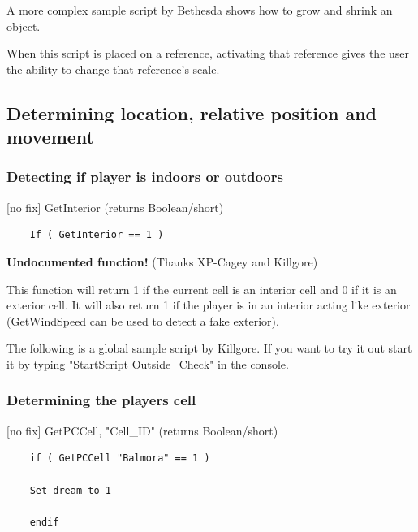 A more complex sample script by Bethesda shows how to grow and shrink an
object.

When this script is placed on a reference, activating that reference
gives the user the ability to change that reference's scale.



\hypertarget{determining-location-relative-position-and-movement}{%
\subsection{\texorpdfstring{\hfill\break
Determining location, relative position and
movement}{ Determining location, relative position and movement}}\label{determining-location-relative-position-and-movement}}

\hypertarget{detecting-if-player-is-indoors-or-outdoors}{%
\subsubsection{Detecting if player is indoors or
outdoors}\label{detecting-if-player-is-indoors-or-outdoors}}

{[}no fix{]} GetInterior (returns Boolean/short)

\begin{lstlisting}
	If ( GetInterior == 1 )
\end{lstlisting}

\textbf{Undocumented function!} (Thanks XP-Cagey and Killgore)

This function will return 1 if the current cell is an interior cell and
0 if it is an exterior cell. It will also return 1 if the player is in
an interior acting like exterior (GetWindSpeed can be used to detect a
fake exterior).

The following is a global sample script by Killgore. If you want to try
it out start it by typing "StartScript Outside\_Check" in the console.



\hypertarget{determining-the-players-cell}{%
\subsubsection{Determining the players
cell}\label{determining-the-players-cell}}

{[}no fix{]} GetPCCell, "Cell\_ID" (returns Boolean/short)

\begin{lstlisting}
	if ( GetPCCell "Balmora" == 1 )
	
	Set dream to 1
	
	endif
\end{lstlisting}


